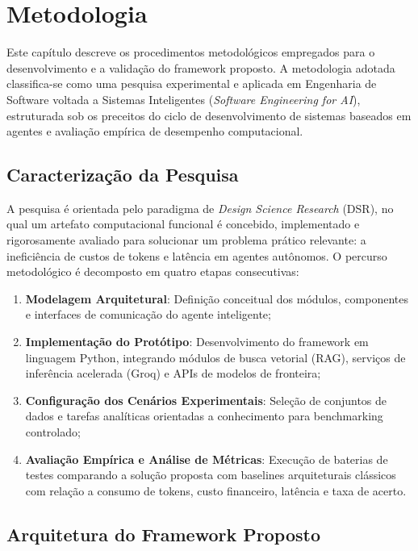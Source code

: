\chapter{Metodologia}\label{metodologia}

Este capítulo descreve os procedimentos metodológicos empregados para o desenvolvimento e a validação do framework proposto. A metodologia adotada classifica-se como uma pesquisa experimental e aplicada em Engenharia de Software voltada a Sistemas Inteligentes (\textit{Software Engineering for AI}), estruturada sob os preceitos do ciclo de desenvolvimento de sistemas baseados em agentes e avaliação empírica de desempenho computacional.

\section{Caracterização da Pesquisa}

A pesquisa é orientada pelo paradigma de \textit{Design Science Research} (DSR), no qual um artefato computacional funcional é concebido, implementado e rigorosamente avaliado para solucionar um problema prático relevante: a ineficiência de custos de tokens e latência em agentes autônomos. O percurso metodológico é decomposto em quatro etapas consecutivas:

\begin{enumerate}
    \item \textbf{Modelagem Arquitetural}: Definição conceitual dos módulos, componentes e interfaces de comunicação do agente inteligente;
    \item \textbf{Implementação do Protótipo}: Desenvolvimento do framework em linguagem Python, integrando módulos de busca vetorial (RAG), serviços de inferência acelerada (Groq) e APIs de modelos de fronteira;
    \item \textbf{Configuração dos Cenários Experimentais}: Seleção de conjuntos de dados e tarefas analíticas orientadas a conhecimento para benchmarking controlado;
    \item \textbf{Avaliação Empírica e Análise de Métricas}: Execução de baterias de testes comparando a solução proposta com baselines arquiteturais clássicos com relação a consumo de tokens, custo financeiro, latência e taxa de acerto.
\end{enumerate}

\section{Arquitetura do Framework Proposto}

